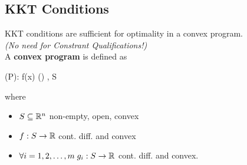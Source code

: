 \subsection{KKT Conditions}

\begin{coro}{}{}
KKT conditions are sufficient for optimality in a convex program.
\medskip\\
\textit{(No need for Constrant Qualifications!)}
\medskip\\
A \textbf{convex program} is defined as
\begin{frml}
	(P): \;  \min f(x) \st \vg(\vx) \leq \vzero, \vx \in S
\end{frml}
where 
\begin{itemize}
	\item
$S \subseteq \mathbb{R}^n$ non-empty, open, convex
\item
$f:S\rightarrow \mathbb{R}$ cont. diff. and convex
\item $\forall i=1, 2, \ldots, m \; g_i:S\rightarrow \mathbb{R}$ cont. diff.
and convex.
\end{itemize}
\end{coro}

